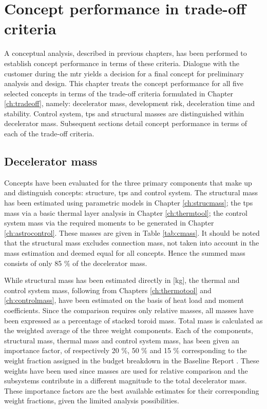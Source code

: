 \section{Concept performance in trade-off criteria}\label{ch:tfsum}

 A conceptual analysis, described in previous chapters, has been performed to establish concept performance in terms of these criteria. Dialogue with the customer during the \acrfull{mtr} yields a decision for a final concept for preliminary analysis and design. This chapter treats the concept performance for all five selected concepts in terms of the trade-off criteria formulated in Chapter \ref{ch:tradeoff}, namely: decelerator mass, development risk, deceleration time and stability. Control system, \acrfull{tps} and structural masses are distinguished within decelerator mass. Subsequent sections detail concept performance in terms of each of the trade-off criteria.

\subsection{Decelerator mass}
Concepts have been evaluated for the three primary components that make up and distinguish concepts: structure, \acrfull{tps} and control system. The structural mass has been estimated using parametric models in Chapter \ref{ch:strucmass}; the \gls{tps} mass via a basic thermal layer analysis in Chapter \ref{ch:thermtool}; the control system mass via the required moments to be generated in Chapter \ref{ch:astrocontrol}.  These masses are given in Table \ref{tab:cmass}. It should be noted that the structural mass excludes connection mass, not taken into account in the mass estimation and deemed equal for all concepts. Hence the summed mass consists of only 85 $\%$ of the decelerator mass. 

While structural mass has been estimated directly in [kg], the thermal and control system mass, following from Chapters \ref{ch:thermotool} and \ref{ch:controlmass}, have been estimated on the basis of heat load and moment coefficients. Since the comparison requires only relative masses, all  masses have been expressed as a percentage of stacked toroid mass. Total mass is calculated as the weighted average of the three weight components. Each of the components, structural mass, thermal mass and control system mass, has been given an importance factor, of respectively 20 $\%$,  50 $\%$ and  15 $\%$ corresponding to the weight fraction assigned in the budget breakdown in the Baseline Report \cite[p.28]{Balasooriyan2015a}. These weights have been used since masses are used for relative comparison and the subsystems contribute in a different magnitude to the total decelerator mass. These importance factors are the best available estimates for their corresponding weight fractions, given the limited analysis possibilities.

